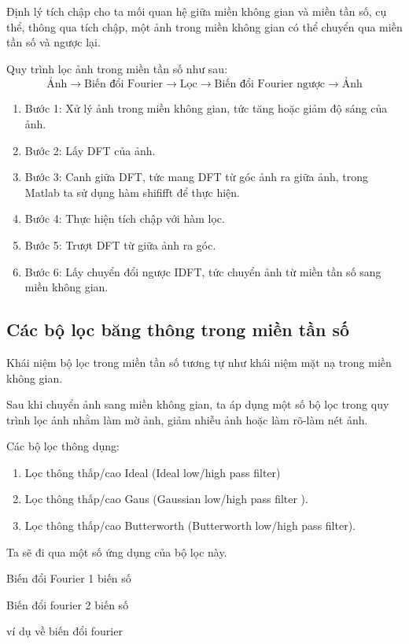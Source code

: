 \documentclass[12pt,a4paper]{report}
\numberwithin{equation}{section}
\theoremstyle{definition} %
\begin{document}
Định lý tích chập cho ta mối quan hệ giữa miền không gian và miền tần số, cụ thể, thông qua tích chập, một ảnh trong miền không gian có thể chuyển qua miền tần số và ngược lại.

Quy trình lọc ảnh trong miền tần số như sau:
\[\text{Ảnh}\rightarrow\text{Biến đổi Fourier}\rightarrow\text{Lọc}\rightarrow\text{Biến đổi Fourier ngược}
\rightarrow\text{Ảnh}\]
\begin{enumerate}
\item Bước 1: Xử lý ảnh trong miền không gian, tức tăng hoặc giảm độ sáng của ảnh.
\item Bước 2: Lấy DFT của ảnh.
\item Bước 3: Canh giữa DFT, tức mang DFT từ góc ảnh ra giữa ảnh, trong Matlab ta sử dụng hàm shififft để thực hiện.
\item Bước 4: Thực hiện tích chập với hàm lọc.
\item Bước 5: Trượt DFT từ giữa ảnh ra góc.
\item Bước 6: Lấy chuyển đổi ngược IDFT, tức chuyển ảnh từ miền tần số sang miền không gian.
\end{enumerate}
\subsection{Các bộ lọc băng thông trong miền tần số}

Khái niệm bộ lọc trong miền tần số tương tự như khái niệm mặt nạ trong miền không gian.

Sau khi chuyển ảnh sang miền không gian, ta áp dụng một số bộ lọc trong quy trình lọc ảnh nhằm làm mờ ảnh, giảm nhiễu ảnh hoặc làm rõ-làm nét ảnh.

Các bộ lọc thông dụng:
\begin{enumerate}
\item Lọc thông thấp/cao Ideal (Ideal low/high pass filter)
\item Lọc thông thấp/cao Gaus (Gaussian low/high pass filter
).

\item Lọc thông thấp/cao Butterworth (Butterworth low/high pass filter).


\end{enumerate}

Ta sẽ đi qua một số ứng dụng của bộ lọc này.

Biến đổi Fourier 1 biến số

Biến đổi fourier 2 biến số

ví dụ về biến đổi fourier
\end{document}
